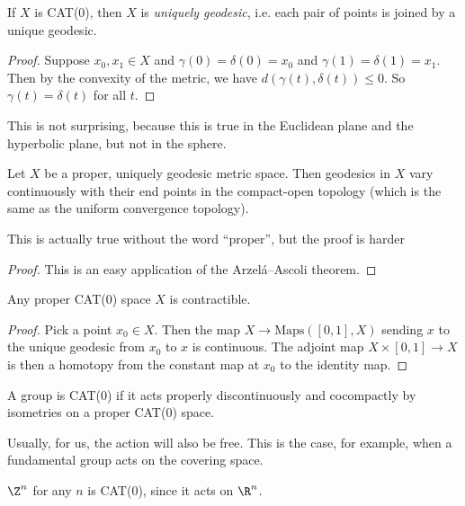 \documentclass[a4paper]{article}
\begin{document}
\begin{lemma}
  If $X$ is CAT(0), then $X$ is \emph{uniquely geodesic}, i.e. each pair of points is joined by a unique geodesic.
\end{lemma}

\begin{proof}
  Suppose $x_0, x_1 \in X$ and $\gamma(0) = \delta(0) = x_0$ and $\gamma(1) = \delta(1) = x_1$. Then by the convexity of the metric, we have $d(\gamma(t), \delta(t)) \leq 0$. So $\gamma(t) = \delta(t)$ for all $t$. %
\end{proof}
This is not surprising, because this is true in the Euclidean plane and the hyperbolic plane, but not in the sphere.

\begin{lemma}
  Let $X$ be a proper, uniquely geodesic metric space. Then geodesics in $X$ vary continuously with their end points in the compact-open topology (which is the same as the uniform convergence topology).
\end{lemma}
This is actually true without the word ``proper'', but the proof is harder

\begin{proof}
  This is an easy application of the Arzel\'a--Ascoli theorem.
\end{proof}

\begin{prop}
  Any proper CAT(0) space $X$ is contractible.
\end{prop}

\begin{proof}
  Pick a point $x_0 \in X$. Then the map $X \to \mathrm{Maps}([0, 1], X)$ sending $x$ to the unique geodesic from $x_0$ to $x$ is continuous. The adjoint map $X \times [0, 1] \to X$ is then a homotopy from the constant map at $x_0$ to the identity map.
\end{proof}

\begin{defi}
  A group is CAT(0) if it acts properly discontinuously and cocompactly by isometries on a proper CAT(0) space.
\end{defi}
Usually, for us, the action will also be free. This is the case, for example, when a fundamental group acts on the covering space.

\begin{eg}
  $\Z^n$ for any $n$ is CAT(0), since it acts on $\R^n$.
\end{eg}
\end{document}
